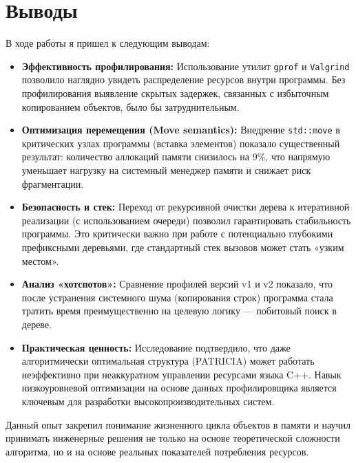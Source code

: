 \section{Выводы}

В ходе работы я пришел к следующим выводам:
\begin{itemize}
    \item \textbf{Эффективность профилирования:} Использование утилит \texttt{gprof} и \texttt{Valgrind} позволило наглядно увидеть распределение ресурсов внутри программы. Без профилирования выявление скрытых задержек, связанных с избыточным копированием объектов, было бы затруднительным.
    
    \item \textbf{Оптимизация перемещения (Move semantics):} Внедрение \texttt{std::move} в критических узлах программы (вставка элементов) показало существенный результат: количество аллокаций памяти снизилось на 9\%, что напрямую уменьшает нагрузку на системный менеджер памяти и снижает риск фрагментации.
    
    \item \textbf{Безопасность и стек:} Переход от рекурсивной очистки дерева к итеративной реализации (с использованием очереди) позволил гарантировать стабильность программы. Это критически важно при работе с потенциально глубокими префиксными деревьями, где стандартный стек вызовов может стать «узким местом».
    
    \item \textbf{Анализ «хотспотов»:} Сравнение профилей версий v1 и v2 показало, что после устранения системного шума (копирования строк) программа стала тратить время преимущественно на целевую логику — побитовый поиск в дереве.
    
    \item \textbf{Практическая ценность:} Исследование подтвердило, что даже алгоритмически оптимальная структура (PATRICIA) может работать неэффективно при неаккуратном управлении ресурсами языка C++. Навык низкоуровневой оптимизации на основе данных профилировщика является ключевым для разработки высокопроизводительных систем.
\end{itemize}

Данный опыт закрепил понимание жизненного цикла объектов в памяти и научил принимать инженерные решения не только на основе теоретической сложности алгоритма, но и на основе реальных показателей потребления ресурсов.

\pagebreak